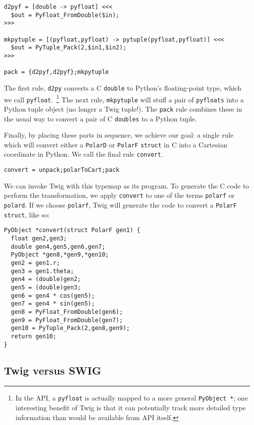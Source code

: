 \begin{verbatim}
d2pyf = [double -> pyfloat] <<<
  $out = PyFloat_FromDouble($in);
>>>

mkpytuple = [(pyfloat,pyfloat) -> pytuple(pyfloat,pyfloat)] <<<
  $out = PyTuple_Pack(2,$in1,$in2);
>>>

pack = {d2pyf,d2pyf};mkpytuple
\end{verbatim}

The first rule, \texttt{d2py} converts a C \texttt{double} to Python's floating-point type, which we call \texttt{pyfloat}.~\footnote{In the API, a \texttt{pyfloat} is actually mapped to a more general \texttt{PyObject *}; one interesting benefit of Twig is that it can potentially track more detailed type information than would be available from API itself.} The next rule, \texttt{mkpytuple} will stuff a pair of \texttt{pyfloats} into a Python tuple object (no longer a Twig tuple!). The \texttt{pack} rule combines these in the usual way to convert a pair of C \texttt{doubles} to a Python tuple.

Finally, by placing these parts in sequence, we achieve our goal: a single rule which will convert either a \texttt{PolarD} or \texttt{PolarF} \texttt{struct} in C into a Cartesian coordinate  in Python. We call the final rule \texttt{convert}.

\begin{verbatim}
convert = unpack;polarToCart;pack
\end{verbatim}

We can invoke Twig with this typemap as its program. To generate the C code to perform the transformation, we apply \texttt{convert} to one of the terms \texttt{polarf} or \texttt{polard}. If we choose \texttt{polarf}, Twig will generate the code to convert a \texttt{PolarF} \texttt{struct}, like so:

\begin{verbatim}
PyObject *convert(struct PolarF gen1) {
  float gen2,gen3;
  double gen4,gen5,gen6,gen7;
  PyObject *gen8,*gen9,*gen10;
  gen2 = gen1.r;
  gen3 = gen1.theta;
  gen4 = (double)gen2;
  gen5 = (double)gen3;
  gen6 = gen4 * cos(gen5);  
  gen7 = gen4 * sin(gen5);
  gen8 = PyFloat_FromDouble(gen6);
  gen9 = PyFloat_FromDouble(gen7);
  gen10 = PyTuple_Pack(2,gen8,gen9);
  return gen10;
}
\end{verbatim}

\subsection{Twig versus SWIG}


